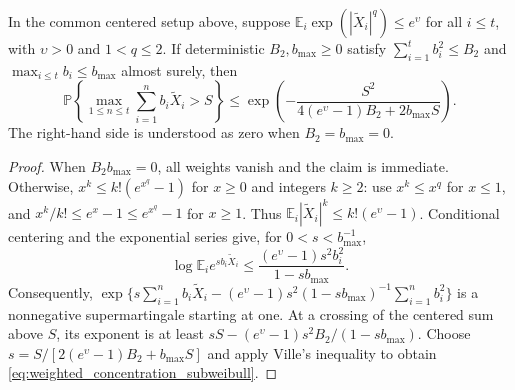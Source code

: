 \documentclass{article}
\begin{document}
\begin{lemma}
\label{lem:weighted_concentration_subweibull}
In the common centered setup above, suppose
\(\mathbb E_i\exp(|\widetilde X_i|^q)\le e^\upsilon\) for all
\(i\le t\), with \(\upsilon>0\) and \(1<q\le2\).
If deterministic \(B_2,b_{\max}\ge0\) satisfy
\(\sum_{i=1}^t b_i^2\le B_2\) and
\(\max_{i\le t}b_i\le b_{\max}\) almost surely, then
\begin{equation}\label{eq:weighted_concentration_subweibull}
\mathbb P\left\{\max_{1\le n\le t}
\sum_{i=1}^n b_i\widetilde X_i>S\right\}
\le\exp\!\left(-\frac{S^2}{4(e^\upsilon-1)B_2+2b_{\max}S}\right).
\end{equation}
The right-hand side is understood as zero when \(B_2=b_{\max}=0\).
\end{lemma}
\begin{proof}
When \(B_2b_{\max}=0\), all weights vanish and the claim is immediate.
Otherwise, \(x^k\le k!(e^{x^q}-1)\) for \(x\ge0\) and integers
\(k\ge2\): use \(x^k\le x^q\) for \(x\le1\), and
\(x^k/k!\le e^x-1\le e^{x^q}-1\) for \(x\ge1\).
Thus \(\mathbb E_i|\widetilde X_i|^k\le k!(e^\upsilon-1)\).
Conditional centering and the exponential series give, for
\(0<s<b_{\max}^{-1}\),
\begin{equation}\label{eq:subweibull_conditional_mgf}
\log\mathbb E_i e^{sb_i\widetilde X_i}
\le\frac{(e^\upsilon-1)s^2b_i^2}{1-sb_{\max}}.
\end{equation}
Consequently,
\(\exp\{s\sum_{i=1}^n b_i\widetilde X_i
-(e^\upsilon-1)s^2(1-sb_{\max})^{-1}\sum_{i=1}^n b_i^2\}\)
is a nonnegative supermartingale starting at one. At a crossing of
the centered sum above \(S\), its exponent is at least
\(sS-(e^\upsilon-1)s^2B_2/(1-sb_{\max})\).
Choose \(s=S/[2(e^\upsilon-1)B_2+b_{\max}S]\) and apply Ville's
inequality to obtain \eqref{eq:weighted_concentration_subweibull}.
\end{proof}
\end{document}
